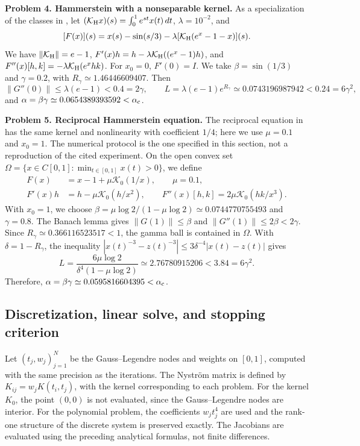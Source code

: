\documentclass[11pt,a4paper]{article}
\numberwithin{equation}{section}
\numberwithin{table}{section}
\theoremstyle{plain}
\theoremstyle{definition}\newtheorem{definition}[theorem]{Definition}
\theoremstyle{remark}\newtheorem{remark}[theorem]{Remark}
\begin{document}
\medskip
\noindent\textbf{Problem 4. Hammerstein with a nonseparable kernel.}
As a specialization of the classes in \cite{EzquerroHernandez2024}, let
$(\mathcal K_{\rm H}x)(s)=\int_0^1e^{st}x(t)\,dt$,
$\lambda=10^{-2}$, and
\[
 [F(x)](s)=x(s)-\sin(s/3)
 -\lambda[\mathcal K_{\rm H}(e^x-1-x)](s).
\]
We have $\|\mathcal K_{\rm H}\|=e-1$,
$F'(x)h=h-\lambda\mathcal K_{\rm H}((e^x-1)h)$, and
$F''(x)[h,k]=-\lambda\mathcal K_{\rm H}(e^xhk)$.
For $x_0=0$, $F'(0)=I$. We take $\beta=\sin(1/3)$ and $\gamma=0.2$,
with $R_\gamma\simeq1.46446609407$. Then
\[
 \|G''(0)\|\leq\lambda(e-1)<0.4=2\gamma,\qquad
 L=\lambda(e-1)e^{R_\gamma}\simeq0.0743196987942<0.24=6\gamma^2,
\]
and $\alpha=\beta\gamma\simeq0.0654389393592<\alpha_{\rm c}$.

\medskip
\noindent\textbf{Problem 5. Reciprocal Hammerstein equation.}
The reciprocal equation in \cite[equation~(6), p.~2941]{AmatBusquierGutierrez2011}
has the same kernel and nonlinearity with coefficient $1/4$; here
we use $\mu=0.1$ and $x_0=1$. The numerical protocol is the one
specified in this section, not a reproduction of the cited experiment.
On the open convex
set $\Omega=\{x\in C[0,1]:\min_{t\in[0,1]}x(t)>0\}$, we define
\[
\begin{aligned}
 F(x)&=x-1+\mu\mathcal K_0(1/x),\qquad \mu=0.1,\\
 F'(x)h&=h-\mu\mathcal K_0(h/x^2),\qquad
 F''(x)[h,k]=2\mu\mathcal K_0(hk/x^3).
\end{aligned}
\]
With $x_0=1$, we choose
$\beta=\mu\log2/(1-\mu\log2)\simeq0.0744770755493$ and $\gamma=0.8$.
The Banach lemma gives $\|G(1)\|\leq\beta$ and
$\|G''(1)\|\leq2\beta<2\gamma$.
Since $R_\gamma\simeq0.366116523517<1$, the gamma ball is contained
in $\Omega$. With $\delta=1-R_\gamma$, the inequality
$|x(t)^{-3}-z(t)^{-3}|\leq3\delta^{-4}|x(t)-z(t)|$ gives
\[
 L=\frac{6\mu\log2}{\delta^4(1-\mu\log2)}
 \simeq2.76780915206<3.84=6\gamma^2.
\]
Therefore, $\alpha=\beta\gamma\simeq0.0595816604395<\alpha_{\rm c}$.

\subsection{Discretization, linear solve, and stopping criterion}
Let $(t_j,w_j)_{j=1}^N$ be the Gauss--Legendre nodes and weights on
$[0,1]$, computed with the same precision as the iterations.
The Nystr\"om matrix is defined by $K_{ij}=w_jK(t_i,t_j)$, with the
kernel corresponding to each problem. For the kernel $K_0$, the point
$(0,0)$ is not evaluated, since the Gauss--Legendre nodes are interior.
For the polynomial problem, the coefficients $w_jt_j^4$ are used and
the rank-one structure of the discrete system is preserved exactly.
The Jacobians are evaluated using the preceding analytical formulas,
not finite differences.
\end{document}
